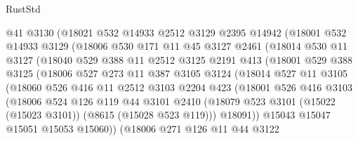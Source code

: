 \begin{lexlean}{RustStd}
\begin{coremodule}
            @41
            @3130
            (@18021
              @532
              @14933
              @2512
              @3129
              @2395
              @14942
              (@18001
                @532
                @14933
                @3129
                (@18006
                  @530
                  @171
                  @11
                  @45
                  @3127
                  @2461
                  (@18014
                    @530
                    @11
                    @3127
                    (@18040
                      @529
                      @388
                      @11
                      @2512
                      @3125
                      @2191
                      @413
                      (@18001
                        @529
                        @388
                        @3125
                        (@18006
                          @527
                          @273
                          @11
                          @387
                          @3105
                          @3124
                          (@18014
                            @527
                            @11
                            @3105
                            (@18060
                              @526
                              @416
                              @11
                              @2512
                              @3103
                              @2204
                              @423
                              (@18001
                                @526
                                @416
                                @3103
                                (@18006
                                  @524
                                  @126
                                  @119
                                  @44
                                  @3101
                                  @2410
                                  (@18079
                                    @523
                                    @3101
                                    (@15022 (@15023 @3101))
                                    (@8615 (@15028 @523 @119)))
                                  @18091))
                              @15043
                              @15047
                              @15051
                              @15053
                              @15060))
                          (@18006
                            @271
                            @126
                            @11
                            @44
                            @3122

\end{coremodule}
\end{lexlean}
